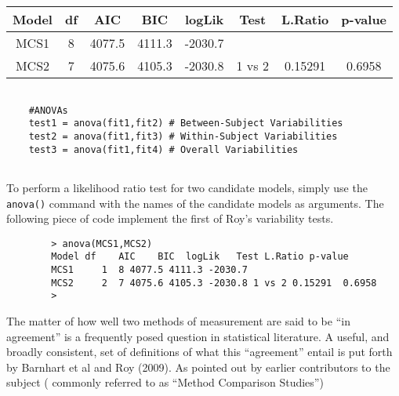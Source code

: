 \documentclass[12pt, a4paper]{report}
\theoremstyle{plain}
\theoremstyle{definition}
\theoremstyle{remark}
\begin{document}
%	
%	
%		
\begin{center}
	\begin{tabular}{|c|c|c|c|c|c|c|c|}
		\hline
		Model   &      df &   AIC  & BIC      & logLik & Test & L.Ratio & p-value \\ \hline
		MCS1    &       8 & 4077.5 & 4111.3 & -2030.7  &       &         &        \\ \hline
		MCS2    &       7 & 4075.6 & 4105.3 & -2030.8  & 1 vs 2 & 0.15291 & 0.6958 \\
		\hline 
	\end{tabular} 
\end{center}
\begin{framed}	
	\begin{verbatim}
	
	#ANOVAs
	test1 = anova(fit1,fit2) # Between-Subject Variabilities
	test2 = anova(fit1,fit3) # Within-Subject Variabilities
	test3 = anova(fit1,fit4) # Overall Variabilities
	
	\end{verbatim}
\end{framed}

	To perform a likelihood ratio test for two candidate models, simply use the \texttt{anova()} command with the names of the candidate models as arguments. The following piece of code implement the first of Roy's variability tests.
	
	\begin{framed}
		\begin{verbatim}
		> anova(MCS1,MCS2)
		Model df    AIC    BIC  logLik   Test L.Ratio p-value
		MCS1     1  8 4077.5 4111.3 -2030.7
		MCS2     2  7 4075.6 4105.3 -2030.8 1 vs 2 0.15291  0.6958
		>
		\end{verbatim}
	\end{framed}



The matter of how well two methods of measurement are said to be “in agreement” is a frequently posed question in statistical literature. A useful, and broadly consistent, set of definitions of what this “agreement” entail is put forth by Barnhart et al and Roy (2009). 
As pointed out by earlier contributors to the subject ( commonly referred to as “Method Comparison Studies”)
\end{document}
